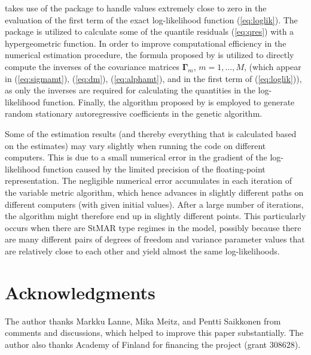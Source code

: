 \documentclass[nojss]{jss} %
\begin{document}
 takes use of the  package  \citep{Hankin:2007} to handle values extremely close to zero in the evaluation of the first term of the exact log-likelihood function (\ref{eq:loglik}). The package  \citep{Hankin:2006} is utilized to calculate some of the quantile residuals (\ref{eq:qres}) with a hypergeometric function. In order to improve computational efficiency in the numerical estimation procedure, the formula proposed by \cite{Galbraith+Galbraith:1974} is utilized to directly compute the inverses of the covariance matrices $\boldsymbol{\Gamma}_m$, $m=1,...,M$, (which appear in (\ref{eq:sigmamt}), (\ref{eq:dm}), (\ref{eq:alphamt}), and in the first term of (\ref{eq:loglik})), as only the inverses are required for calculating the quantities in the log-likelihood function. Finally, the algorithm proposed by \cite{Monahan:1984} is employed to generate random stationary autoregressive coefficients in the genetic algorithm.

Some of the estimation results (and thereby everything that is calculated based on the estimates) may vary slightly when running the code on different computers. This is due to a small numerical error in the gradient of the log-likelihood function caused by the limited precision of the floating-point representation. The negligible numerical error accumulates in each iteration of the variable metric algorithm, which hence advances in slightly different paths on different computers (with given initial values). After a large number of iterations, the algorithm might therefore end up in slightly different points. This particularly occurs when there are StMAR type regimes in the model, possibly because there are many different pairs of degrees of freedom and variance parameter values that are relatively close to each other and yield almost the same log-likelihoods.


\section*{Acknowledgments}
The author thanks Markku Lanne, Mika Meitz, and Pentti Saikkonen from comments and discussions, which helped to improve this paper substantially. The author also thanks Academy of Finland for financing the project (grant 308628).

\pagebreak


\newpage
\end{document}
